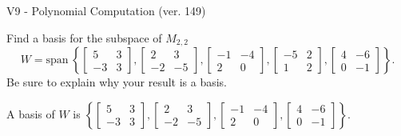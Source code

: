 \begin{exercise}
  \begin{exerciseTitle}V9 - Polynomial Computation (ver. 149)\end{exerciseTitle}
  \begin{exerciseStatement}
    Find a basis for the subspace of \(M_{2,2}\) 
\[W=\mathrm{span}\ \left\{\left[\begin{array}{cc}
5 & 3 \\
-3 & 3
\end{array}\right] , \left[\begin{array}{cc}
2 & 3 \\
-2 & -5
\end{array}\right] , \left[\begin{array}{cc}
-1 & -4 \\
2 & 0
\end{array}\right] , \left[\begin{array}{cc}
-5 & 2 \\
1 & 2
\end{array}\right] , \left[\begin{array}{cc}
4 & -6 \\
0 & -1
\end{array}\right]\right\}.\]
 Be sure to explain why your result is a basis.


  \end{exerciseStatement}
  \begin{exerciseAnswer}
   A basis of \(W\) is  \(\left\{\left[\begin{array}{cc}
5 & 3 \\
-3 & 3
\end{array}\right] , \left[\begin{array}{cc}
2 & 3 \\
-2 & -5
\end{array}\right] , \left[\begin{array}{cc}
-1 & -4 \\
2 & 0
\end{array}\right] , \left[\begin{array}{cc}
4 & -6 \\
0 & -1
\end{array}\right]\right\}\).
  


  \end{exerciseAnswer}
\end{exercise}